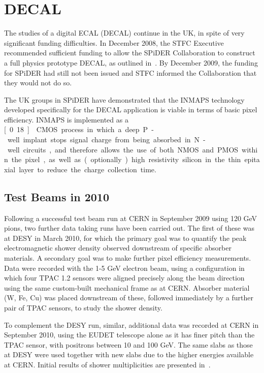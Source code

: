 \section{DECAL}

The studies of a digital ECAL (DECAL) continue in the UK, in spite of very significant
funding difficulties. In December 2008, the STFC Executive recommended sufficient funding
to allow the SPiDER Collaboration to construct a full physics prototype DECAL, as outlined
in~\cite{Adloff:2010aa}. By December 2009, the funding for SPiDER had still not been issued and STFC
informed the Collaboration that they would not do so.

The UK groups in SPiDER have demonstrated that the INMAPS technology developed
specifically for the DECAL application is viable in terms of basic pixel efficiency. INMAPS is
implemented as a \unit[0.18]{\micron} CMOS process in which a deep P-well implant stops signal charge
from being absorbed in N-well circuits, and therefore allows the use of both NMOS and
PMOS within the pixel, as well as (optionally) high resistivity silicon in the thin epitaxial
layer to reduce the charge collection time.

\subsection{Test Beams in 2010}
Following a successful test beam run at CERN in September 2009 using 120 GeV pions, two
further data taking runs have been carried out. The first of these was at DESY in March
2010, for which the primary goal was to quantify the peak electromagnetic shower density
observed downstream of specific absorber materials. A secondary goal was to make further
pixel efficiency measurements. Data were recorded with the 1-5 GeV electron beam, using a
configuration in which four TPAC 1.2 sensors were aligned precisely along the beam direction
using the same custom-built mechanical frame as at CERN. Absorber material (W, Fe, Cu)
was placed downstream of these, followed immediately by a further pair of TPAC sensors, to
study the shower density.

To complement the DESY run, similar, additional data was recorded at CERN in September 2010, using the EUDET telescope alone as it has finer pitch than the TPAC sensor, with positrons between 10 and 100 GeV. The same slabs as those at DESY were used together with
new slabs due to the higher energies available at CERN. Initial results of shower multiplicities
are presented in~\cite{Price:2012vta}.

